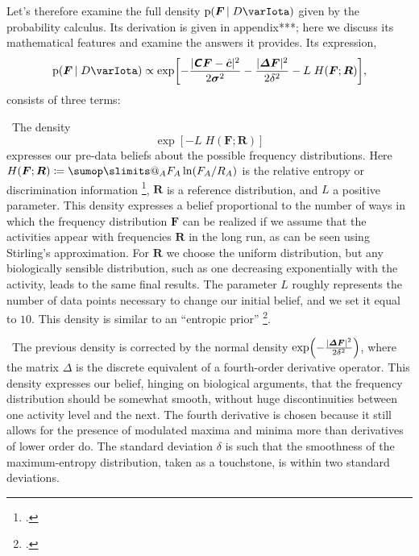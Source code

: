 \documentclass[\ifafour a4paper,12pt,\else a5paper,10pt,\fi%
onecolumn,oneside,article,%
british%
]{memoir}
\makeatletter
\theoremstyle{remark}
\theoremstyle{innote}
\def\sum{\DOTSI\sumop\slimits@}
\newcommand*{\mathte}[1]{\textbf{\textit{\textsf{#1}}}}
\newcommand*{\citep}{\footcites}
\newcommand*{\defd}{\coloneqq}
\DeclarePairedDelimiter\abs{\lvert}{\rvert}
\newcommand*{\pf}{\mathrm{p}}%
\renewcommand*{\|}[1][]{\nonscript\,#1\vert\nonscript\;\mathopen{}}
\newcommand*{\sect}{\S}%
\newcommand*{\yAv}{A}
\newcommand*{\yFF}{F}
\newcommand*{\yF}{\bm{\yFF}}
\newcommand*{\yA}{\yAv}%
\newcommand*{\yI}{\varIota}
\newcommand*{\yD}{D}
\newcommand*{\yc}{\Hat{\bm{c}}}
\newcommand*{\ysh}{H}
\newcommand*{\yRR}{R}
\newcommand*{\yR}{\bm{\yRR}}
\newcommand*{\ycmm}{C}
\newcommand*{\ycm}{\mathte{\ycmm}}
\newcommand*{\ycs}{\bm{\sigma}}
\newcommand*{\yL}{L}
\newcommand*{\yd}{\bm{\varDelta}}
\newcommand*{\yds}{\delta}
\makeatother
\begin{document}
\bigskip

Let's therefore examine the full density $\pf(\yF \| \yD \yI)$ given by the
probability calculus. Its derivation is given in appendix***; here we
 discuss its mathematical features and examine the answers it
provides. Its expression,
\begin{equation}
  \label{eq:density_proportional}
  \pf(\yF \| \yD \yI) \propto \exp\biggl[
-  \frac{\abs{\ycm\yF - \yc}^{2}}{2\ycs^{2}}
-  \frac{\abs{\yd\yF}^{2}}{2\yds^{2}}
-\yL\;\ysh(\yF;\yR)\biggr],
\end{equation}
consists of three terms:

\textbullet\ The density
\begin{equation}
\exp[-\yL\;\ysh(\yF;\yR)]\label{eq:entropic_prior}
\end{equation}
expresses our pre-data
beliefs about the possible frequency distributions. Here
$\ysh(\yF;\yR)\defd \sum_{\yA}\yFF_{\yA}\ln(\yFF_{\yA}/\yRR_{\yA})$ is the
relative entropy or discrimination information
\citep{kullback1987,jaynes1963,hobson1969,hobsonetal1973}, $\yR$ is a
reference distribution, and $\yL$ a positive parameter. This density
expresses a belief proportional to the number of ways in which the
frequency distribution $\yF$ can be realized if we assume that the
activities appear with frequencies $\yR$ in the long run, as can be seen
using Stirling's approximation. For $\yR$ we choose the uniform
distribution, but any biologically sensible distribution, such as one
decreasing exponentially with the activity, leads to the same final
results. The parameter $\yL$ roughly represents the number of data points
necessary to change our initial belief, and we set it equal to $10$. This
density is similar to an \enquote{entropic prior}
\citep{rodriguez1991,skilling1998,catichaetal2004,portamana2017}[see
esp.][\sect~3]{neumann2007}.

\textbullet\ The previous density is corrected by the normal density
$\exp\Bigl(-\frac{\abs{\yd\yF}^{2}}{2\yds^{2}}\Bigr)$, where the matrix
$\yd$ is the discrete equivalent of a fourth-order derivative
operator. %
This density expresses our belief, hinging on biological arguments, that
the frequency distribution should be somewhat smooth, without huge
discontinuities between one activity level and the next. The fourth
derivative is chosen because it still allows for the presence of modulated
maxima and minima more than derivatives of lower order do. The standard
deviation $\yds$ is such that the smoothness of the maximum-entropy
distribution, taken as a touchstone, is within two standard deviations.
\end{document}
